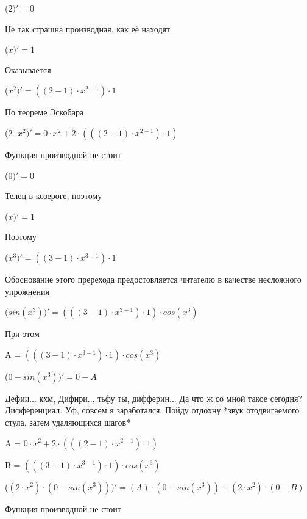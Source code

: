 \documentclass[12pt,a4paper,fleqn]{article}
\begin{document}
\begin{center}
 ($2)'
  = 0$\end{center}
Не так страшна производная, как её находят\cite{link2}

\begin{center}
 ($x)'
  = 1$\end{center}
Оказывается

\begin{center}
 ($x^{2})'
  = ((2-1) \cdot x^{2-1}) \cdot 1$\end{center}
По теореме Эскобара

\begin{center}
 ($2 \cdot x^{2})'
  = 0 \cdot x^{2}+2 \cdot (((2-1) \cdot x^{2-1}) \cdot 1)$\end{center}
Функция производной не стоит\cite{link2}

\begin{center}
 ($0)'
  = 0$\end{center}
Телец в козероге, поэтому

\begin{center}
 ($x)'
  = 1$\end{center}
Поэтому

\begin{center}
 ($x^{3})'
  = ((3-1) \cdot x^{3-1}) \cdot 1$\end{center}
Обоснование этого пререхода предостовляется читателю в качестве несложного упрожнения

\begin{center}
 ($sin(x^{3}))'
  = (((3-1) \cdot x^{3-1}) \cdot 1) \cdot cos(x^{3})$\end{center}
При этом

\begin{center}
A = $(((3-1) \cdot x^{3-1}) \cdot 1) \cdot cos(x^{3})$\end{center}
\begin{center}
 ($0-sin(x^{3}))'
  = 0-A$\end{center}
Дефии... кхм, Дифири... тьфу ты, дифферин... Да что ж со мной такое сегодня? Дифференциал. Уф, совсем я заработался. Пойду отдохну *звук отодвигаемого стула, затем удаляющихся шагов*

\begin{center}
A = $0 \cdot x^{2}+2 \cdot (((2-1) \cdot x^{2-1}) \cdot 1)$\end{center}
\begin{center}
B = $(((3-1) \cdot x^{3-1}) \cdot 1) \cdot cos(x^{3})$\end{center}
\begin{center}
 ($(2 \cdot x^{2}) \cdot (0-sin(x^{3})))'
  = (A) \cdot (0-sin(x^{3}))+(2 \cdot x^{2}) \cdot (0-B)$\end{center}
Функция производной не стоит\cite{link2}
\end{document}
